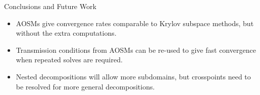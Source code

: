 \documentclass{beamer}
\begin{document}


\begin{frame}{Conclusions and Future Work}
\begin{itemize}
\item AOSMs give convergence rates comparable to Krylov subspace methods, but without the extra computations.
\item Transmission conditions from AOSMs can be re-used to give fast convergence when repeated solves are required.
\item Nested decompositions will allow more subdomains, but crosspoints need to be resolved for more general decompositions.
\end{itemize}
\end{frame}
\end{document}
